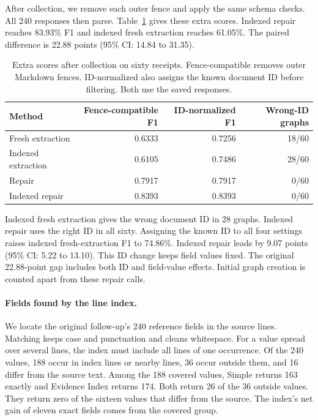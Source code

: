 After collection, we remove each outer fence and apply the same schema
checks. All 240 responses then parse.
Table~\ref{tab:reextraction_recovery} gives these extra scores.
Indexed repair reaches 83.93\% F1 and indexed fresh extraction reaches
61.05\%. The paired difference is 22.88 points
(95\% CI: 14.84 to 31.35).

\begin{table}[t]
\centering
\caption{Extra scores after collection on sixty receipts. Fence-compatible removes outer Markdown fences. ID-normalized also assigns the known document ID before filtering. Both use the saved responses.}
\label{tab:reextraction_recovery}
\small
\begin{tabular}{lrrr}
\toprule
Method & Fence-compatible F1 & ID-normalized F1 & Wrong-ID graphs \\
\midrule
Fresh extraction & 0.6333 & 0.7256 & 18/60 \\
Indexed extraction & 0.6105 & 0.7486 & 28/60 \\
Repair & 0.7917 & 0.7917 & 0/60 \\
Indexed repair & 0.8393 & 0.8393 & 0/60 \\
\bottomrule
\end{tabular}
\end{table}

Indexed fresh extraction gives the wrong document ID in 28 graphs.
Indexed repair uses the right ID in all sixty.
Assigning the known ID to all four settings raises indexed fresh-extraction
F1 to 74.86\%. Indexed repair leads by 9.07 points
(95\% CI: 5.22 to 13.10). This ID change keeps field values fixed.
The original 22.88-point gap includes both ID and field-value effects.
Initial graph creation is counted apart from these repair calls.

\paragraph{Fields found by the line index.}

We locate the original follow-up's 240 reference fields in the source lines.
Matching keeps case and punctuation and cleans whitespace.
For a value spread over several lines, the index must include all lines of
one occurrence. Of the 240 values, 188 occur in index lines or nearby lines,
36 occur outside them, and 16 differ from the source text.
Among the 188 covered values, Simple returns 163 exactly and Evidence Index
returns 174. Both return 26 of the 36 outside values.
They return zero of the sixteen values that differ from the source.
The index's net gain of eleven exact fields comes from the covered group.

